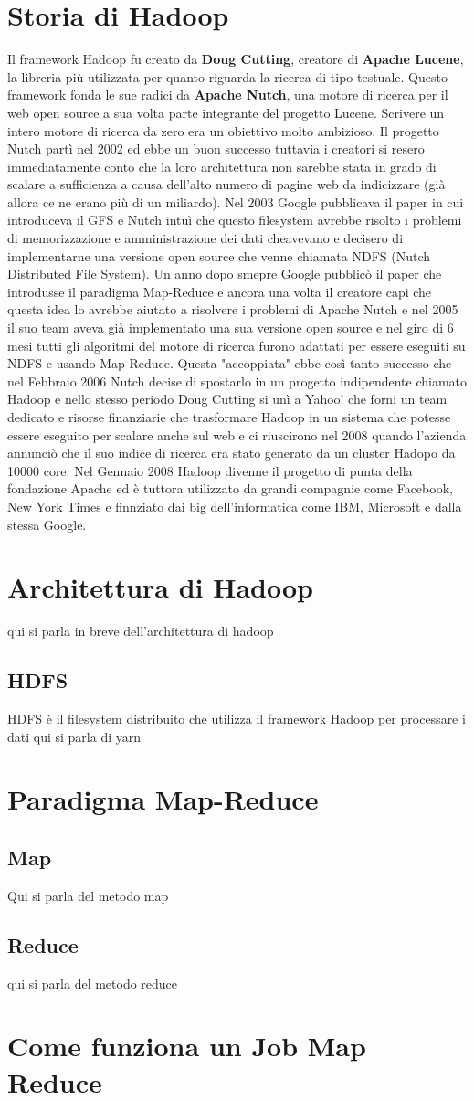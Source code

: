 \section{Storia di Hadoop}
Il framework Hadoop fu creato da \textbf{Doug Cutting}, creatore di \textbf{Apache Lucene}, la libreria più utilizzata per quanto riguarda la ricerca di tipo testuale. Questo framework fonda le sue radici da \textbf{Apache Nutch}, una motore di ricerca per il web open source a sua volta parte integrante del progetto Lucene. Scrivere un intero motore di ricerca da zero era un obiettivo molto ambizioso. Il progetto Nutch partì nel 2002 ed ebbe un buon successo tuttavia i creatori si resero immediatamente conto che la loro architettura non sarebbe stata in grado di scalare a sufficienza a causa dell'alto numero di pagine web da indicizzare (già allora ce ne erano più di un miliardo). Nel 2003 Google pubblicava il paper in cui introduceva il GFS e Nutch intuì che questo filesystem avrebbe risolto i problemi di memorizzazione e amministrazione dei dati cheavevano e decisero di implementarne una versione open source che venne chiamata NDFS (Nutch Distributed File System). Un anno dopo smepre Google pubblicò il paper che introdusse il paradigma Map-Reduce e ancora una volta il creatore capì che questa idea lo avrebbe aiutato a risolvere i problemi di Apache Nutch e nel 2005 il suo team aveva già implementato una sua versione open source e nel giro di 6 mesi tutti gli algoritmi del motore di ricerca furono adattati per essere eseguiti su NDFS e usando Map-Reduce. Questa "accoppiata" ebbe così tanto successo che nel Febbraio 2006 Nutch decise di spostarlo in un progetto indipendente chiamato Hadoop e nello stesso periodo Doug Cutting si unì a Yahoo! che forni un team dedicato e risorse finanziarie che trasformare Hadoop in un sistema che potesse essere eseguito per scalare anche sul web e ci riuscirono nel 2008 quando l'azienda annunciò che il suo indice di ricerca era stato generato da un cluster Hadopo da 10000 core. Nel Gennaio 2008 Hadoop divenne il progetto di punta della fondazione Apache ed è tuttora utilizzato da grandi compagnie come Facebook, New York Times e finnziato dai big dell'informatica come IBM, Microsoft e dalla stessa Google.
\section{Architettura di Hadoop}
qui si parla in breve dell'architettura di hadoop
\subsection{HDFS}
HDFS è il filesystem distribuito che utilizza il framework Hadoop per processare i dati
qui si parla di yarn
\section{Paradigma Map-Reduce}
\subsection{Map}
Qui si parla del metodo map
\subsection{Reduce}
qui si parla del metodo reduce
\section{Come funziona un Job Map Reduce}
